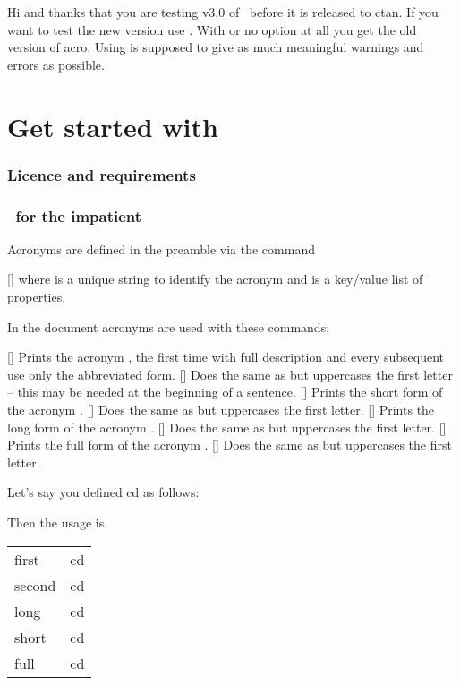 \documentclass{acro-manual}
\begin{document}
\begin{bewareofthedog}
  Hi and thanks that you are testing v3.0 of \acro\ before it is released to
  \ac{ctan}. If you want to test the new version use
  . With  or no
  option at all you get the old version of acro.  Using
   is supposed to give
  as much meaningful warnings and errors as possible.
\end{bewareofthedog}

\part{Get started with \acro}

\section{Licence and requirements}
\license

\section{\acro\ for the impatient}

Acronyms are defined in the preamble via the command
\begin{commands}
  []
    where  is a unique string to identify the acronym and
     is a key\slash value list of properties.
\end{commands}
In the document acronyms are used with these commands:
\begin{commands}
  []
    Prints the acronym , the first time with full description and
    every subsequent use only the abbreviated form.
  []
    Does the same as  but uppercases the first letter -- this may be
    needed at the beginning of a sentence.
  []
    Prints the short form of the acronym .
  []
    Does the same as  but uppercases the first letter.
  []
    Prints the long form of the acronym .
  []
    Does the same as  but uppercases the first letter.
  []
    Prints the full form of the acronym .
  []
    Does the same as  but uppercases the first letter.
\end{commands}
Let's say you defined \acs*{cd} as follows:
\begin{sourcecode}
\end{sourcecode}
Then the usage is
\begin{example}
  \begin{tabular}{ll}
    first  & \ac{cd} \\
    second & \ac{cd} \\
    long   & \acl{cd} \\
    short  & \acs{cd} \\
    full   & \acf{cd}
  \end{tabular}
\end{example}
\end{document}
